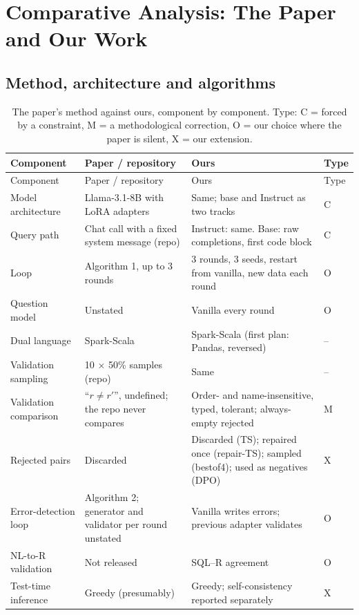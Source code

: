 \chapter{Comparative Analysis: The Paper and Our Work}\label{ch:comparison}

\section{Method, architecture and algorithms}

{\small
{}
\begin{longtable}{@{}p{3.0cm}p{4.9cm}p{4.9cm}p{1.8cm}@{}}
\caption{The paper's method against ours, component by component. Type: C = forced by a constraint, M = a
methodological correction, O = our choice where the paper is silent, X = our extension.}\label{tab:adaptations}\\
\toprule\rowcolor{headshade}Component & Paper / repository & Ours & Type\\\midrule\endfirsthead
\toprule\rowcolor{headshade}Component & Paper / repository & Ours & Type\\\midrule\endhead
\bottomrule\endfoot
Model architecture & Llama-3.1-8B with LoRA adapters & Same; base and Instruct as two tracks & C\\
Query path & Chat call with a fixed system message (repo) & Instruct: same. Base: raw completions, first code block
& C\\
Loop & Algorithm 1, up to 3 rounds & 3 rounds, 3 seeds, restart from vanilla, new data each round & O\\
Question model & Unstated & Vanilla every round & O\\
Dual language & Spark-Scala & Spark-Scala (first plan: Pandas, reversed) & --\\
Validation sampling & 10 $\times$ 50\% samples (repo) & Same & --\\
Validation comparison & ``$r \neq r'$'', undefined; the repo never compares & Order- and name-insensitive, typed,
tolerant; always-empty rejected & M\\
Rejected pairs & Discarded & Discarded (TS); repaired once (repair-TS); sampled (bestof4); used as negatives (DPO) &
X\\
Error-detection loop & Algorithm 2; generator and validator per round unstated & Vanilla writes errors; previous
adapter validates & O\\
NL-to-R validation & Not released & SQL--R agreement & O\\
Test-time inference & Greedy (presumably) & Greedy; self-consistency reported separately & X\\
\end{longtable}
}

